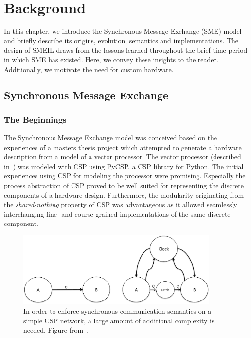 \chapter{Background}
In this chapter, we introduce the Synchronous Message Exchange (SME) model and
briefly describe its origins, evolution, semantics and implementations. The
design of SMEIL draws from the lessons learned throughout the brief time period
in which SME has existed. Here, we convey these insights to the
reader. Additionally, we motivate the need for custom hardware.

\section{Synchronous Message Exchange}
\label{sec:sme}

\subsection{The Beginnings}
The Synchronous Message Exchange model was conceived based on the experiences of
a masters thesis project \cite{Skaarup14} which attempted to generate a hardware
description from a model of a vector processor. The vector processor (described
in~\cite{rehr2013bpu}) was modeled with CSP using PyCSP, a CSP library for
Python. The initial experiences using CSP for modeling the processor were
promising. Especially the process abstraction of CSP proved to be well suited
for representing the discrete components of a hardware design. Furthermore, the
modularity originating from the {\itshape shared-nothing} property of CSP was
advantageous as it allowed seamlessly interchanging fine- and course grained
implementations of the same discrete component.

\begin{figure}
  \centering
  \includegraphics[width=0.9\textwidth]{figures/clocked.pdf}
  \caption{In order to enforce synchronous communication semantics on a simple
    CSP network, a large amount of additional complexity is needed. Figure
    from~\cite{vinter2014synchronous}.}
  \label{fig:clocked}
\end{figure}


